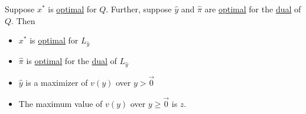 \begin{theorem}\label{thm:Lagrangian-dual-theorem}
	Suppose \(x^{\ast}\) is \hyperref[def:optimal-solution]{optimal} for \(Q\). Further, suppose \(\hat{y}\) and \(\hat{\pi}\) are \hyperref[def:optimal-solution]{optimal}
	for the \hyperref[def:dual]{dual} of \(Q\). Then
	\begin{itemize}
		\item \(x^{\ast}\) is \hyperref[def:optimal-solution]{optimal} for \(L_{\hat{y}}\)
		\item \(\hat{\pi}\) is \hyperref[def:optimal-solution]{optimal} for the \hyperref[def:dual]{dual} of \(L_{\hat{y}}\)
		\item \(\hat{y}\) is a maximizer of \(v(y)\) over \(y>\vec{0}\)
		\item The maximum value of \(v(y)\) over \(y\geq \vec{0}\) is \(z\).
	\end{itemize}
\end{theorem}
